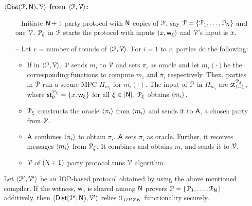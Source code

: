 \textbf{$\langle \mathsf{Dist}(\mathcal{P}, \mathsf{N}),\mathcal{V}\rangle$ from $\langle \mathcal{P},\mathcal{V}\rangle$:}
\begin{itemize}
	\item[--] Initiate $\mathsf{N} + 1$ party protocol with $\mathsf{N}$ copies of $\mathcal{P}$, say $\mathcal{P} = \{\mathcal{P}_1, \ldots, \mathcal{P}_{\mathsf{N}}\}$ and one $\mathcal{V}$. $\mathcal{P}_\xi$ in $\mathcal{P}$ starts the protocol with inputs $({x}, \mathsf{w}_\xi)$ and $\mathcal{V}$'s input is ${x}$.
	\item[--] Let $r$ = number of rounds of $\langle \mathcal{P},\mathcal{V}\rangle$. 
	For $i = 1$ to $r$, parties do the following:
	\begin{itemize}
		\item If in $\langle \mathcal{P},\mathcal{V}\rangle$, $\mathcal{P}$ sends $m_i$ to $\mathcal{V}$ and sets $\pi_i$ as oracle and let $m_i(\cdot)$be the corresponding functions to compute $m_i$ and $\pi_i$ respectively. Then, parties in $\mathcal{P}$ run a secure MPC $\Pi_{m_i}$ for $m_i(\cdot)$. The input of $\mathcal{P}$ in $\Pi_{m_i}$ are $\mathsf{st}^{\mathcal{P}_\xi}_{i-1}$, where $\mathsf{st}^{\mathcal{P}_\xi}_{0} = \{{x}, \mathsf{w}_{\xi}\}$ for all $\xi \in [\mathsf{N}]$. $\mathcal{P}_{\xi}$ obtains $\langle m_i \rangle$.
		\item $\mathcal{P}_{\xi}$ constructs the oracle $\langle \pi_i \rangle$ from $\langle m_i \rangle$ and sends it to $\mathsf{A}$, a chosen party from $\mathcal{P}$.
		\item $\mathsf{A}$ combines $\langle \pi_i \rangle$ to obtain $\pi_i$. $\mathsf{A}$ sets $\pi_i$ as oracle. Further, it receives messages $\langle m_i \rangle$ from $\mathcal{P}_{\xi}$. It combines and obtains $m_i$ and sends it to $\mathcal{V}$. 
		\item $\mathcal{V}$ of $(\mathsf{N} + 1)$ party protocol runs $\mathcal{V}$ algorithm.
	\end{itemize}	
\end{itemize}

\begin{lemma}\label{lemma:generic_dpzk}
	Let $\langle \mathcal{P}', \mathcal{V}' \rangle$ be an IOP-based protocol obtained by using the above mentioned compiler. If the witness, $\mathsf{w}$, is shared among $\mathsf{N}$ provers $\mathcal{P} = \{\mathcal{P}_1, \ldots, \mathcal{P}_{\mathsf{N}}\}$ additively, then $\langle \mathsf{Dist}(\mathcal{P}', \mathsf{N}), \mathcal{V}' \rangle$ relies $\mathcal{F}_{DPZK}$ functionality securely.
\end{lemma}
	
